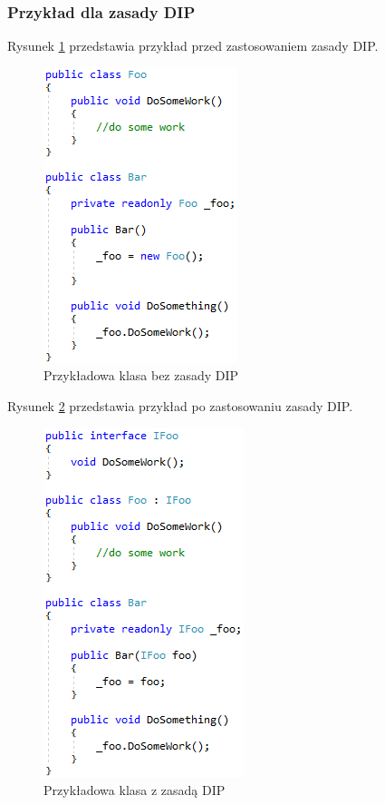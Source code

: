 \documentclass[12pt]{article}
\begin{document}
\subsubsection{Przykład dla zasady DIP}
Rysunek \ref{fig:Solid_without} przedstawia przykład przed zastosowaniem zasady DIP.\\
\begin{figure}[H]
	\begin{center}
  		\includegraphics{Solid_without.png}
  		\caption{Przykładowa klasa bez zasady DIP}
  		\label{fig:Solid_without}
	\end{center}
\end{figure}
Rysunek \ref{fig:Solid_with} przedstawia przykład po zastosowaniu zasady DIP.\\
\begin{figure}[H]
	\begin{center}
  		\includegraphics{Solid_with.png}
  		\caption{Przykładowa klasa z zasadą DIP}
  		\label{fig:Solid_with}
	\end{center}
\end{figure}
\end{document}

